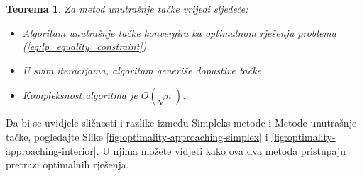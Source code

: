 \documentclass[a4paper, utf8, 11pt, colorlinks]{book}
\newtheorem{thm}{Teorema}
\begin{document}
\begin{thm} Za metod unutrašnje tačke vrijedi sljedeće:
	\begin{itemize}
		\item Algoritam unutrašnje tačke konvergira ka optimalnom rješenju problema (\ref{eq:lp_equality_constraint}). %
		\item U svim iteracijama, algoritam generiše dopustive tačke.
		\item Kompleksnost algoritma je $O(\sqrt{n})$. %
	\end{itemize}
\end{thm}

Da bi se uvidjele sličnosti i razlike između Simpleks metode i Metode unutrašnje tačke, pogledajte Slike \ref{fig:optimality-approaching-simplex} i  \ref{fig:optimality-approaching-interior}. U njima možete vidjeti kako ova dva metoda pristupaju pretrazi optimalnih rješenja. 
\end{document}
